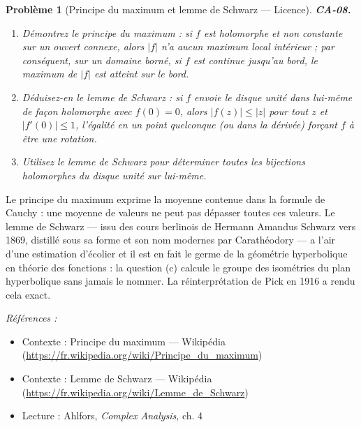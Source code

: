 \documentclass[11pt]{article}
\newtheorem{problem}{Problème}
\newenvironment{refs}{\par\small\noindent\emph{Références :}\begin{itemize}\setlength\itemsep{0pt}}{\end{itemize}\normalsize}
\begin{document}
\begin{problem}[{Principe du maximum et lemme de Schwarz --- Licence}]
\textbf{CA-08.} \begin{enumerate}
\item[(a)] Démontrez le principe du maximum : si $ f $ est
holomorphe et non constante sur un ouvert connexe, alors $ |f| $ n'a aucun maximum local
intérieur ; par conséquent, sur un domaine borné, si $ f $ est continue jusqu'au bord, le maximum
de $ |f| $ est atteint sur le bord.
\item[(b)] Déduisez-en le lemme de Schwarz : si $ f $ envoie le disque
unité dans lui-même de façon holomorphe avec $ f(0) = 0 $, alors $ |f(z)| \le |z| $ pour tout
$ z $ et $ |f'(0)| \le 1 $, l'égalité en un point quelconque (ou dans la dérivée) forçant
$ f $ à être une rotation.
\item[(c)] Utilisez le lemme de Schwarz pour déterminer toutes les bijections holomorphes du disque unité
sur lui-même.
\end{enumerate}

\end{problem}

\noindent Le principe du maximum exprime la moyenne contenue dans la formule de Cauchy :
une moyenne de valeurs ne peut pas dépasser toutes ces valeurs. Le lemme de Schwarz --- issu des cours
berlinois de Hermann Amandus Schwarz vers 1869, distillé sous sa forme et son nom modernes par
Carathéodory --- a l'air d'une estimation d'écolier et il est en fait le germe de la géométrie
hyperbolique en théorie des fonctions : la question (c) calcule le groupe des isométries du plan
hyperbolique sans jamais le nommer. La réinterprétation de Pick en 1916 a rendu cela exact.

\begin{refs}
\item Contexte : Principe du maximum --- Wikipédia (\url{https://fr.wikipedia.org/wiki/Principe_du_maximum})
\item Contexte : Lemme de Schwarz --- Wikipédia (\url{https://fr.wikipedia.org/wiki/Lemme_de_Schwarz})
\item Lecture : Ahlfors, \textit{Complex Analysis}, ch. 4
\end{refs}

\bigskip
\end{document}
